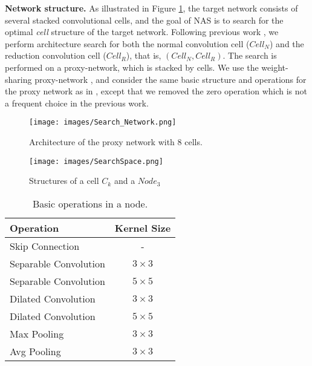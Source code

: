 \documentclass[conference]{IEEEtran}
\begin{document}
\noindent\textbf{Network structure.} As illustrated in Figure \ref{fig:network_arc}, the target network consists of several stacked convolutional cells, and the goal of NAS is to search for the optimal \emph{cell} structure of the target network.
Following previous work \cite{liu2018darts}, we perform architecture search for both the normal convolution cell ($Cell_{N}$) and the reduction convolution cell ($Cell_{R}$), that is, $(Cell_{N}, Cell_{R})$. 
The search is performed on a proxy-network, which is stacked by cells. We use the weight-sharing proxy-network \cite{pham2018efficient}, and consider the same basic structure and operations for the proxy network as in \cite{liu2018darts}, except that we removed the zero operation which is not a frequent choice in the previous work.

\begin{figure}[!ht]
    \centering
    \texttt{[image: images/Search\_Network.png]}
    \caption{Architecture of the proxy network with 8 cells.}
    \label{fig:network_arc}
    \vskip -0.15in
\end{figure}
\begin{figure}[!ht]
	\begin{center}
        \texttt{[image: images/SearchSpace.png]}
    \end{center}
    \caption{Structures of a cell $C_k$ and a $Node_3$}
    \label{fig:cmab_search_space}
    \vskip -0.15in
\end{figure}
\begin{table}[!ht]
\caption{Basic operations in a node.}
\vskip -0.1in
\label{tab:search_space_ops}
\begin{center}
\begin{tabular}{lc}
\hline
\textbf{Operation} & \textbf{Kernel Size} \\ \hline
Skip Connection & - \\ 
Separable Convolution & $3\times3$ \\ 
Separable Convolution & $5\times5$ \\ 
Dilated Convolution & $3\times3$ \\ 
Dilated Convolution & $5\times5$ \\ 
Max Pooling & $3\times3$ \\ 
Avg Pooling & $3\times3$ \\ \hline
\end{tabular}
\end{center}
\vskip -0.1in
\end{table}
\end{document}
